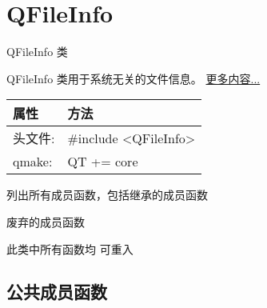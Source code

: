 \chapter{QFileInfo}

QFileInfo 类

QFileInfo 类用于系统无关的文件信息。
\href{https://github.com/JackLovel/QtDocumentCN/blob/master/Src/F/QFileInfo/QFileInfo.md#%E8%AF%A6%E7%BB%86%E6%8F%8F%E8%BF%B0}{
  更多内容...} 

\begin{tabular}{|l|l|}
\hline
属性 &	方法\\
\hline
头文件:& 	\#include <QFileInfo>\\
\hline
qmake:& 	QT += core\\
\hline
\end{tabular}

\begin{compactitem}
\item 列出所有成员函数，包括继承的成员函数
\item 废弃的成员函数
\end{compactitem}

\begin{notice}
	此类中所有函数均 可重入
\end{notice}


\splitLine

\section{公共成员函数}

